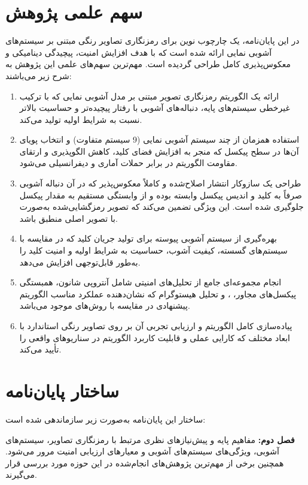 \section{سهم علمی پژوهش}
در این پایان‌نامه، یک چارچوب نوین برای رمزنگاری تصاویر رنگی مبتنی بر سیستم‌های آشوبی نمایی ارائه شده است که با هدف افزایش امنیت، پیچیدگی دینامیکی و معکوس‌پذیری کامل طراحی گردیده است. مهم‌ترین سهم‌های علمی این پژوهش به شرح زیر می‌باشند:
\begin{enumerate}
    \item ارائه یک الگوریتم رمزنگاری تصویر مبتنی بر مدل آشوبی نمایی که با ترکیب غیرخطی سیستم‌های پایه، دنباله‌های آشوبی با رفتار پیچیده‌تر و حساسیت بالاتر نسبت به شرایط اولیه تولید می‌کند.
    \item استفاده همزمان از چند سیستم آشوبی نمایی (9 سیستم متفاوت) و انتخاب پویای آن‌ها در سطح پیکسل که منجر به افزایش فضای کلید، کاهش الگوپذیری و ارتقای مقاومت الگوریتم در برابر حملات آماری و دیفرانسیلی می‌شود.
    \item طراحی یک سازوکار انتشار اصلاح‌شده و کاملاً معکوس‌پذیر که در آن دنباله آشوبی صرفاً به کلید و اندیس پیکسل وابسته بوده و از وابستگی مستقیم به مقدار پیکسل جلوگیری شده است. این ویژگی تضمین می‌کند که تصویر رمزگشایی‌شده به‌صورت  با تصویر اصلی منطبق باشد.
    \item بهره‌گیری از سیستم آشوبی پیوسته  برای تولید جریان کلید که در مقایسه با سیستم‌های گسسته، کیفیت آشوب، حساسیت به شرایط اولیه و امنیت کلید را به‌طور قابل‌توجهی افزایش می‌دهد.
    \item انجام مجموعه‌ای جامع از تحلیل‌های امنیتی شامل آنتروپی شانون\protect{}، همبستگی پیکسل‌های مجاور، ،  و تحلیل هیستوگرام که نشان‌دهنده عملکرد مناسب الگوریتم پیشنهادی در مقایسه با روش‌های موجود می‌باشد.
    \item پیاده‌سازی کامل الگوریتم و ارزیابی تجربی آن بر روی تصاویر رنگی استاندارد با ابعاد مختلف که کارایی عملی و قابلیت کاربرد الگوریتم در سناریوهای واقعی را تأیید می‌کند.
\end{enumerate}

\section{ساختار پایان‌نامه}
ساختار این پایان‌نامه به‌صورت زیر سازماندهی شده است:

\textbf{فصل دوم:} مفاهیم پایه و پیش‌نیازهای نظری مرتبط با رمزنگاری تصاویر، سیستم‌های آشوبی، ویژگی‌های سیستم‌های آشوبی و معیارهای ارزیابی امنیت مرور می‌شود. همچنین برخی از مهم‌ترین پژوهش‌های انجام‌شده در این حوزه مورد بررسی قرار می‌گیرند.

